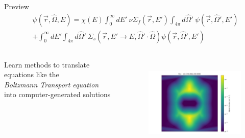 \documentclass[xcolor=x11names,compress, handout]{beamer}
\renewcommand{\(}{\begin{columns}}
\renewcommand{\)}{\end{columns}}
\newcommand{\<}[1]{\begin{column}{#1}}
\renewcommand{\>}{\end{column}}
\newcommand{\Macro}{\ensuremath{\Sigma}}
\newcommand{\vOmega}{\ensuremath{\hat{\Omega}}}
\begin{document}

\begin{frame}{Preview}
\begin{align}
  [\vOmega \cdot \nabla + \Macro(\vec{r}, E)] &\psi(\vec{r}, \vOmega, E)  = \chi(E) \int_0^{\infty} dE' \:\nu \Macro_{f}(\vec{r}, E') \int_{4\pi} d\vOmega' \:\psi(\vec{r}, \vOmega', E')  \nonumber \\
   &+ \int_0^{\infty} dE' \int_{4\pi} d\vOmega' \:\Macro_{s}(\vec{r}, E' \to E, \vOmega' \cdot \vOmega) \psi(\vec{r}, \vOmega', E')  \nonumber
\end{align}
\vspace{-2em}
\begin{columns}
  \begin{column}{0.5\textwidth}
    Learn methods to translate equations like the \\\emph{Boltzmann Transport equation} \\into computer-generated solutions
  \end{column}
  \begin{column}{0.5\textwidth}
    \begin{figure}
    \includegraphics[height=1.75in,clip]{../figs/WattsBarFlux}
    \end{figure}
  \end{column}
\end{columns}
\end{frame}
\end{document}
